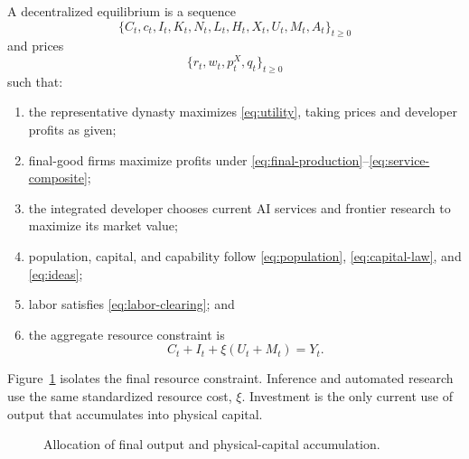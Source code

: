 A decentralized equilibrium is a sequence
\[
    \{C_t,c_t,I_t,K_t,N_t,L_t,H_t,X_t,U_t,M_t,A_t\}_{t\geq0}
\]
and prices
\[
    \{r_t,w_t,p^X_t,q_t\}_{t\geq0}
\]
such that:
\begin{enumerate}[label=(\roman*)]
    \item the representative dynasty maximizes \eqref{eq:utility}, taking prices and
    developer profits as given;
    \item final-good firms maximize profits under
    \eqref{eq:final-production}--\eqref{eq:service-composite};
    \item the integrated developer chooses current AI services and frontier research
    to maximize its market value;
    \item population, capital, and capability follow
    \eqref{eq:population}, \eqref{eq:capital-law}, and \eqref{eq:ideas};
    \item labor satisfies \eqref{eq:labor-clearing}; and
    \item the aggregate resource constraint is
    \begin{equation}
        C_t+I_t+\xi(U_t+M_t)=Y_t.
        \label{eq:resource-constraint}
    \end{equation}
\end{enumerate}

Figure~\ref{fig:goods-allocation-flow} isolates the final resource constraint.
Inference and automated research use the same standardized resource cost, $\xi$.
Investment is the only current use of output that accumulates into physical capital.

\begin{figure}[H]
    \centering
    \caption{Allocation of final output and physical-capital accumulation.}
    \label{fig:goods-allocation-flow}
\end{figure}

